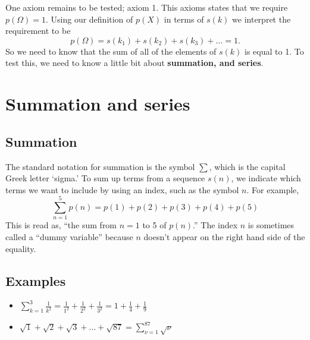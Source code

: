 \noindent One axiom remains to be tested; axiom 1. This axioms states that we require $p(\Omega) = 1$. Using our definition of $p(X)$ in terms of $s(k)$ we interpret the requirement to be
\[
p(\Omega) = s(k_1) + s(k_2) + s(k_3) + \ldots = 1.
\]
So we need to know that the sum of all of the elements of $s(k)$ is equal to 1. To test this, we need to know a little bit about \textbf{summation, and series}.

\section{Summation and series}
\subsection{Summation}
The standard notation for summation is the symbol $\sum$, which is the capital Greek letter `sigma.' To sum up terms from a sequence $s(n)$, we indicate which terms we want to include by using an index, such as the symbol $n$. For example, \label{symbSigma} \label{sigma notation} \label{dummy variable} \label{index(sum)}
\[
\sum_{n=1}^5 p(n) = p(1) + p(2) + p(3) + p(4) + p(5)
\]
This is read as, ``the sum from $n = 1$ to 5 of $p(n)$.'' The index $n$ is sometimes called a ``dummy variable'' because $n$ doesn't appear on the right hand side of the equality.

\subsection{Examples}
\begin{itemize}
\item $\displaystyle{\sum_{k=1}^3\frac{1}{k^2}} = \frac{1}{1^2} + \frac{1}{2^2} + \frac{1}{3^2} = 1 + \frac{1}{4} + \frac{1}{9}$
\item $\displaystyle{\sqrt{1} + \sqrt{2} + \sqrt{3} + \ldots + \sqrt{87} = \sum_{\nu=1}^{87} \sqrt{\nu}}$
\end{itemize}

